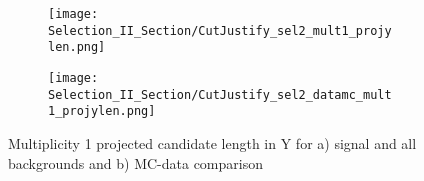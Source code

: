 \begin{figure}[h!]
\centering
  \begin{subfigure}[t]{0.4\textwidth}
    \centering
\texttt{[image: Selection\_II\_Section/CutJustify\_sel2\_mult1\_projylen.png]}
    \caption{ }
  \end{subfigure} 
  \hspace{20mm}
  \begin{subfigure}[t]{0.4\textwidth}
    \centering
\texttt{[image: Selection\_II\_Section/CutJustify\_sel2\_datamc\_mult1\_projylen.png]}
   \caption{ }
  \end{subfigure} 
\caption{Multiplicity 1 projected candidate length in Y for a) signal and all backgrounds and b) MC-data comparison }
\label{fig:cutjust_sel2_mult1_projylen}
\end{figure}


